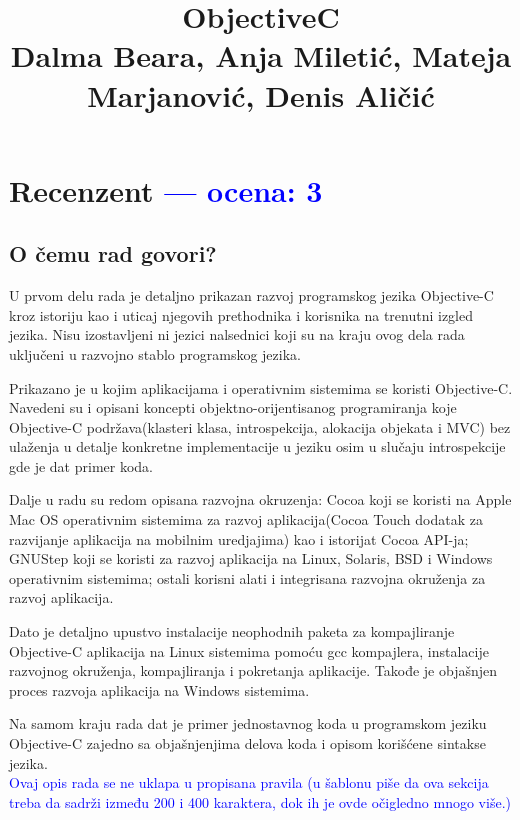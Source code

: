 \documentclass[a4paper]{report}
\newcommand{\odgovor}[1]{\textcolor{blue}{#1}}
\begin{document}
\title{ObjectiveC\\ \small{Dalma Beara, Anja Miletić, Mateja Marjanović, Denis Aličić}}

\maketitle

\tableofcontents
\pagebreak

\chapter{Recenzent \odgovor{--- ocena: 3} }
\section{O čemu rad govori?}
U prvom delu rada je detaljno prikazan razvoj programskog jezika Objective-C kroz istoriju kao i uticaj njegovih prethodnika i korisnika na trenutni izgled jezika. Nisu izostavljeni ni jezici nalsednici koji su na kraju ovog dela rada uključeni u razvojno stablo programskog jezika.

Prikazano je u kojim aplikacijama i operativnim sistemima se koristi Objective-C. Navedeni su i opisani koncepti objektno-orijentisanog programiranja koje Objective-C podržava(klasteri klasa, introspekcija, alokacija objekata i MVC) bez ulaženja u detalje konkretne implementacije u jeziku osim u slučaju introspekcije gde je dat primer koda.

Dalje u radu su redom opisana razvojna okruzenja: Cocoa koji se koristi na Apple Mac OS operativnim sistemima za razvoj aplikacija(Cocoa Touch dodatak za razvijanje aplikacija na mobilnim uredjajima) kao i istorijat Cocoa API-ja; GNUStep koji se koristi za razvoj aplikacija na Linux, Solaris, BSD i Windows operativnim sistemima; ostali korisni alati i integrisana razvojna okruženja za razvoj aplikacija.

Dato je detaljno upustvo instalacije neophodnih paketa za kompajliranje Objective-C aplikacija na Linux sistemima pomoću gcc kompajlera, instalacije razvojnog okruženja, kompajliranja i pokretanja aplikacije. Takođe je objašnjen proces razvoja aplikacija na Windows sistemima.

Na samom kraju rada dat je primer jednostavnog koda u programskom jeziku Objective-C zajedno sa objašnjenjima delova koda i opisom korišćene sintakse jezika. \\
\odgovor{Ovaj opis rada se ne uklapa u propisana pravila (u šablonu piše da ova sekcija treba da sadrži između 200 i 400 karaktera, dok ih je ovde očigledno mnogo više.)}
\end{document}
